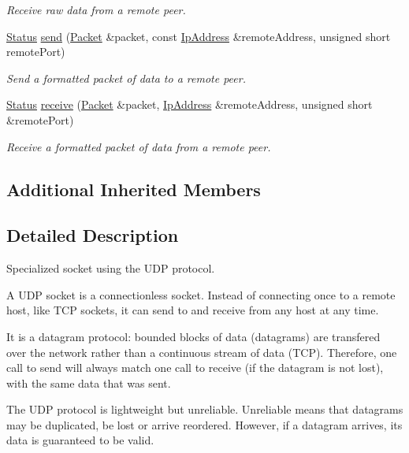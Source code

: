 \begin{DoxyCompactItemize}
\begin{DoxyCompactList}\small\item\em Receive raw data from a remote peer. \end{DoxyCompactList}\item 
\hyperlink{classsf_1_1Socket_a51bf0fd51057b98a10fbb866246176dc}{Status} \hyperlink{classsf_1_1UdpSocket_a48969a62c80d40fd74293a740798e435}{send} (\hyperlink{classsf_1_1Packet}{Packet} \&packet, const \hyperlink{classsf_1_1IpAddress}{Ip\-Address} \&remote\-Address, unsigned short remote\-Port)
\begin{DoxyCompactList}\small\item\em Send a formatted packet of data to a remote peer. \end{DoxyCompactList}\item 
\hyperlink{classsf_1_1Socket_a51bf0fd51057b98a10fbb866246176dc}{Status} \hyperlink{classsf_1_1UdpSocket_afdd5c655d00c96222d5b477fc057a22b}{receive} (\hyperlink{classsf_1_1Packet}{Packet} \&packet, \hyperlink{classsf_1_1IpAddress}{Ip\-Address} \&remote\-Address, unsigned short \&remote\-Port)
\begin{DoxyCompactList}\small\item\em Receive a formatted packet of data from a remote peer. \end{DoxyCompactList}\end{DoxyCompactItemize}
\subsection*{Additional Inherited Members}


\subsection{Detailed Description}
Specialized socket using the U\-D\-P protocol. 

A U\-D\-P socket is a connectionless socket. Instead of connecting once to a remote host, like T\-C\-P sockets, it can send to and receive from any host at any time.

It is a datagram protocol\-: bounded blocks of data (datagrams) are transfered over the network rather than a continuous stream of data (T\-C\-P). Therefore, one call to send will always match one call to receive (if the datagram is not lost), with the same data that was sent.

The U\-D\-P protocol is lightweight but unreliable. Unreliable means that datagrams may be duplicated, be lost or arrive reordered. However, if a datagram arrives, its data is guaranteed to be valid.

